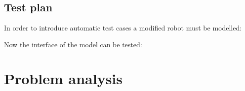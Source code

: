 \documentclass{llncs}
\newcommand{\labelsec}[1]{\label{sec:#1}}
\begin{document}
\subsection{Test plan}
In order to introduce automatic test cases a modified robot must be modelled:

Now the interface of the model can be tested:


\section{Problem analysis}
\labelsec{ProblemAnalysis}

\end{document}
